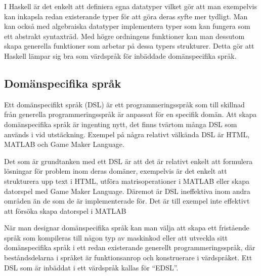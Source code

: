 \documentclass[12pt,a4paper,twoside,openright]{article}
\begin{document}
I Haskell är det enkelt att definiera egna datatyper vilket gör att
man exempelvis kan inkapsla redan existerande typer för att göra deras
syfte mer tydligt. Man kan också med algebraiska datatyper
implementera typer som kan fungera som ett abstrakt syntaxträd. Med
högre ordningens funktioner kan man dessutom skapa generella
funktioner som arbetar på dessa typers strukturer. Detta gör att
Haskell lämpar sig bra som värdspråk för inbäddade domänspecifika
språk.

\subsection{Domänspecifika språk}
Ett domänspecifikt språk (\gls{DSL}) är ett programmeringsspråk som
till skillnad från generella programmeringsspråk är anpassat för en
specifik domän. Att skapa domänspecifika språk är ingenting nytt, det
finns tvärtom många DSL som används i vid utstäckning.
Exempel på några relativt välkända DSL är HTML, MATLAB och Game Maker
Language.

Det som är grundtanken med ett DSL är att det är relativt enkelt att
formulera lösningar för problem inom deras domäner, exempelvis är det
enkelt att strukturera upp text i HTML, utföra matrisoperationer i
MATLAB eller skapa datorspel med Game Maker Language. Däremot är DSL
ineffektiva inom andra områden än de som de är implementerade för.
Det är till exempel inte effektivt att försöka skapa datorspel i
MATLAB

När man designar domänspecifika språk kan man välja att skapa ett
fristående språk som kompileras till någon typ av maskinkod eller att
utveckla sitt domänspecifika språk i ett redan existerande generellt
programmeringsspråk, där beståndsdelarna i språket är funktionsanrop
och konstruerare i värdspråket. Ett DSL som är inbäddat i ett
värdspråk kallas för ``\gls{EDSL}''.
\end{document}
